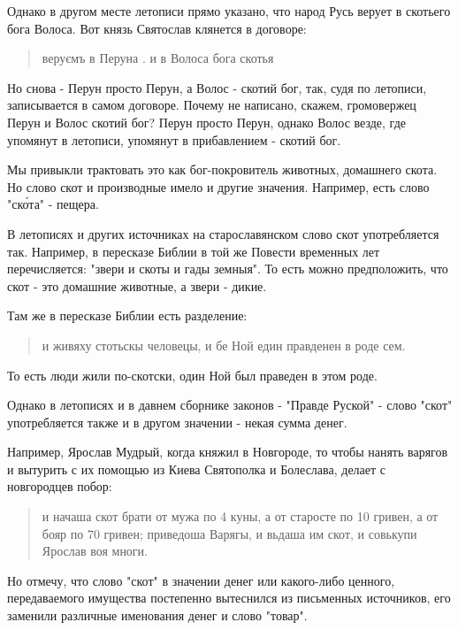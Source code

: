 \documentclass[a5paper,11pt,openany]{article}
\begin{document}
    Однако в другом месте летописи прямо указано, что народ Русь верует в скотьего бога Волоса. Вот князь Святослав клянется в договоре:

\begin{quotation}
\noindent веруємъ в Перуна . и в Волоса бога скотья
\end{quotation}

   Но снова - Перун просто Перун, а Волос - скотий бог, так, судя по летописи, записывается в самом договоре. Почему не написано, скажем, громовержец Перун и Волос скотий бог? Перун просто Перун, однако Волос везде, где упомянут в летописи, упомянут в прибавлением - скотий бог.

   Мы привыкли трактовать это как бог-покровитель животных, домашнего скота. Но слово скот и производные имело и другие значения. Например, есть слово "ск\'ота" - пещера.

   В летописях и других источниках на старославянском слово скот употребляется так. Например, в пересказе Библии в той же Повести временных лет перечисляется: "звери и скоты и гады земныя". То есть можно предположить, что скот - это домашние животные, а звери - дикие.

   Там же в пересказе Библии есть разделение:

\begin{quotation}
\noindent и живяху стотьскы человецы, и бе Ной един правденен в роде сем.
\end{quotation}

   То есть люди жили по-скотски, один Ной был праведен в этом роде.

   Однако в летописях и в давнем сборнике законов - "Правде Руской" - слово "скот" употребляется также и в другом значении - некая сумма денег.

Например, Ярослав Мудрый, когда княжил в Новгороде, то чтобы нанять варягов и вытурить с их помощью из Киева Святополка и Болеслава, делает с новгородцев побор:

\begin{quotation}
\noindent и начаша скот брати от мужа по 4 куны, а от старосте по 10 гривен, а от бояр по 70
гривен; приведоша Варягы, и вьдаша им скот,
и совькупи Ярослав воя многи.
\end{quotation}

   Но отмечу, что слово "скот" в значении денег или какого-либо ценного, передаваемого имущества постепенно вытеснился из письменных источников, его заменили различные именования денег и слово "товар".
\end{document}
